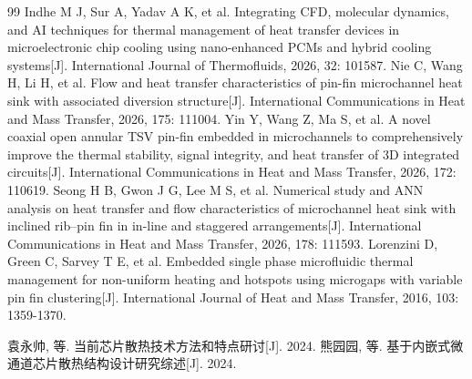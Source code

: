 \documentclass[stage1,fontset=fandol]{ydzjreport}
\begin{document}
\begin{thebibliography}{99}
	   Indhe M J, Sur A, Yadav A K, et al. Integrating CFD, molecular dynamics, and AI techniques for thermal management of heat transfer devices in microelectronic chip cooling using nano-enhanced PCMs and hybrid cooling systems[J]. International Journal of Thermofluids, 2026, 32: 101587.
	   Nie C, Wang H, Li H, et al. Flow and heat transfer characteristics of pin-fin microchannel heat sink with associated diversion structure[J]. International Communications in Heat and Mass Transfer, 2026, 175: 111004.
	   Yin Y, Wang Z, Ma S, et al. A novel coaxial open annular TSV pin-fin embedded in microchannels to comprehensively improve the thermal stability, signal integrity, and heat transfer of 3D integrated circuits[J]. International Communications in Heat and Mass Transfer, 2026, 172: 110619.
	   Seong H B, Gwon J G, Lee M S, et al. Numerical study and ANN analysis on heat transfer and flow characteristics of microchannel heat sink with inclined rib–pin fin in in-line and staggered arrangements[J]. International Communications in Heat and Mass Transfer, 2026, 178: 111593.
	   Lorenzini D, Green C, Sarvey T E, et al. Embedded single phase microfluidic thermal management for non-uniform heating and hotspots using microgaps with variable pin fin clustering[J]. International Journal of Heat and Mass Transfer, 2016, 103: 1359-1370.

	   袁永帅, 等. 当前芯片散热技术方法和特点研讨[J]. 2024.
	   熊园园, 等. 基于内嵌式微通道芯片散热结构设计研究综述[J]. 2024.


\end{thebibliography}
\end{document}
